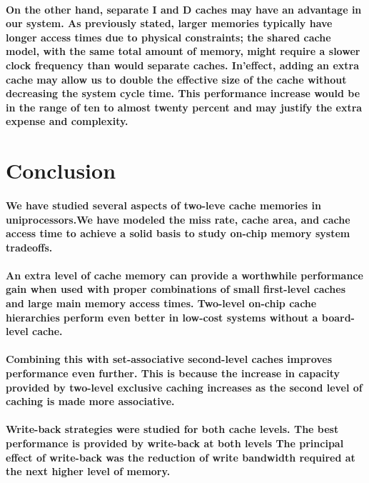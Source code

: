 \documentclass{article}
\begin{document}
\paragraph{On the other hand, separate I and D caches may 
have an advantage in our system. As previously stated, larger
 memories typically have longer access times due to physical
  constraints; the shared cache model, with the same total amount of memory,
   might require a slower clock frequency than would separate caches. In’effect,
    adding an extra cache may allow us to double the effective size of the cache
     without decreasing the system cycle time. This performance increase would be 
     in the range of ten to almost twenty percent and may justify the extra expense 
     and complexity.    
}
\section{Conclusion}

\paragraph{We have studied several aspects of two-leve cache memories in uniprocessors.We have 
modeled the miss rate, cache area, and cache access time to achieve a solid basis to
study on-chip memory system tradeoffs.}

\paragraph{An extra level of cache memory can provide a worthwhile 
performance gain when used with proper combinations
of small first-level caches and large main memory access times.
Two-level on-chip cache hierarchies perform even better in low-cost 
systems without a board-level cache.}

\paragraph{Combining this with set-associative second-level caches 
improves performance even further. This is because the increase in 
capacity provided by two-level exclusive caching increases as the 
second level of caching is made more associative.}

\paragraph{Write-back strategies were studied for both cache levels. 
The best performance is provided by write-back at both levels
The principal effect of write-back was the reduction of write 
bandwidth required at the next higher level of memory.}
\end{document}

